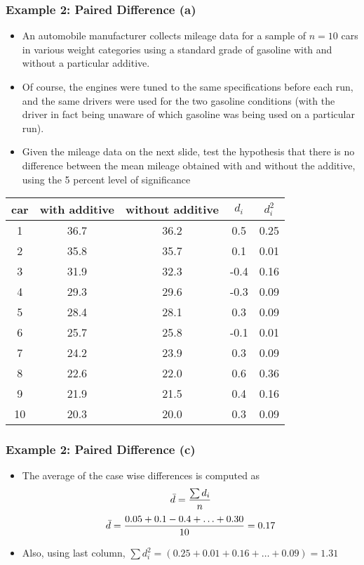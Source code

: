 
\begin{frame}
\frametitle{Example 2: Paired Difference (a)}
\begin{itemize}
\item An automobile manufacturer collects mileage data for a sample of $n = 10$ cars in various weight categories
using a standard grade of gasoline with and without a particular additive. \item Of course, the engines were tuned to the same
specifications before each run, and the same drivers were used for the two gasoline conditions (with the driver in fact being
unaware of which gasoline was being used on a particular run). \item Given the mileage data on the next slide,  test the hypothesis
that there is no difference between the mean mileage obtained with and without the additive, using the 5 percent level of
significance \end{itemize}

\small
\begin{center}
\begin{tabular}{|c|c|c|c|c|}\hline
car & with additive & without additive & $d_i$ & $d^2_i$\\\hline
1&36.7&36.2&0.5&0.25\\\hline
2&35.8&35.7&0.1&0.01\\\hline
3&31.9&32.3&-0.4&0.16\\\hline
4&29.3&29.6&-0.3&0.09\\\hline
5&28.4&28.1&0.3&0.09\\\hline
6&25.7&25.8&-0.1&0.01\\\hline
7&24.2&23.9&0.3&0.09\\\hline
8&22.6&22.0&0.6&0.36\\\hline
9&21.9&21.5&0.4&0.16\\\hline
10&20.3&20.0&0.3&0.09\\\hline
\end{tabular}
\end{center}
\end{frame}

\begin{frame}
\frametitle{Example 2: Paired Difference (c)}
\begin{itemize}
\item The average of the case wise differences is computed as \[\bar{d} = {\sum d_i \over n}\]
\[ \bar{d} = { 0.05 + 0.1  - 0.4 + \ldots + 0.30 \over 10 }= 0.17 \]
\item Also, using last column, $\sum d^2_i = (0.25 + 0.01 + 0.16 + \ldots + 0.09) = 1.31$
\end{itemize}

\end{frame}


